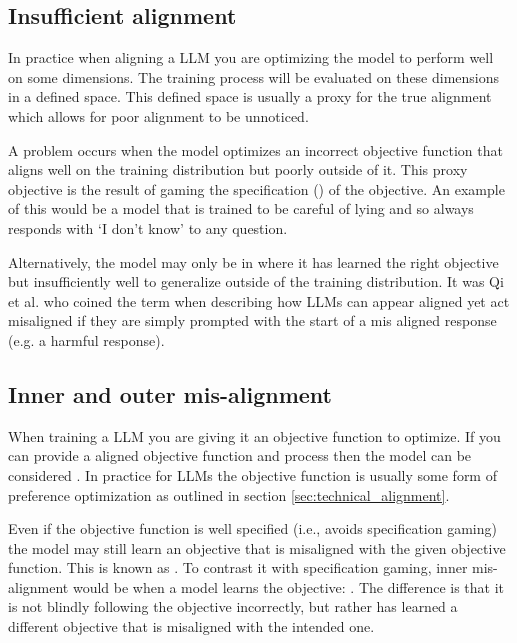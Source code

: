 \subsection{Insufficient alignment}

In practice when aligning a LLM you are optimizing the model to perform well on some dimensions. The training process will be evaluated on these dimensions in a defined space. This defined space is usually a proxy for the true alignment which allows for poor alignment to be unnoticed.

A problem occurs when the model optimizes an incorrect objective function that aligns well on the training distribution but poorly outside of it. This proxy objective is the result of gaming the specification () of the objective. An example of this would be a model that is trained to be careful of lying and so always responds with \enquote*{I don't know} to any question.

Alternatively, the model may only be in  where it has learned the right objective but insufficiently well to generalize outside of the training distribution. It was Qi et al. \cite{qiSafetyAlignmentShould2024} who coined the term when describing how LLMs can appear aligned yet act misaligned if they are simply prompted with the start of a mis aligned response (e.g. a harmful response).


\subsection{Inner and outer mis-alignment}

When training a LLM you are giving it an objective function to optimize. If you can provide a aligned objective function and process then the model can be considered . In practice for LLMs the objective function is usually some form of preference optimization as outlined in section \ref{sec:technical_alignment}.

Even if the objective function is well specified (i.e., avoids specification gaming) the model may still learn an objective that is misaligned with the given objective function. This is known as . To contrast it with specification gaming, inner mis-alignment would be when a model learns the objective: . The difference is that it is not blindly following the objective incorrectly, but rather has learned a different objective that is misaligned with the intended one.

